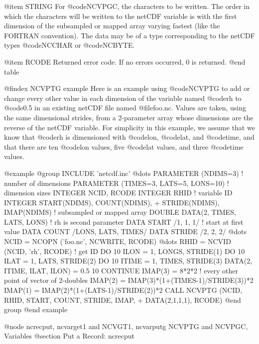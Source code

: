 @item STRING
For @code{NCVPGC}, the characters to be written.  The order in which the
characters will be written to the netCDF variable
is with the
first dimension
of the subsampled or mapped array
varying fastest (like the FORTRAN convention).
The data
may be of a type corresponding to the netCDF types @code{NCCHAR} or
@code{NCBYTE}.

@item RCODE
Returned error code.  If no errors occurred, 0 is returned.
@end table

@findex NCVPTG example
Here is an example using @code{NCVPTG} to add or change every other
value in each dimension
of the variable named @code{rh} to @code{0.5} in an existing
netCDF file named @file{foo.nc}.
Values are taken, using the same dimensional strides, from a 2-parameter
array whose dimensions
are the reverse of the netCDF variable.
For simplicity in this example, we
assume that we know that @code{rh} is dimensioned with @code{lon},
@code{lat}, and @code{time}, and that there are ten @code{lon} values, five
@code{lat} values, and three @code{time} values.

@example
@group
      INCLUDE 'netcdf.inc'
         @dots{}
      PARAMETER (NDIMS=3)         ! number of dimensions
      PARAMETER (TIMES=3, LATS=5, LONS=10) ! dimension sizes
      INTEGER  NCID, RCODE
      INTEGER  RHID               ! variable ID
      INTEGER  START(NDIMS), COUNT(NDIMS),
     +         STRIDE(NDIMS), IMAP(NDIMS)  ! subsampled or mapped array
      DOUBLE DATA(2, TIMES, LATS, LONS)    ! rh is second parameter
      DATA START /1, 1, 1/        ! start at first value
      DATA COUNT /LONS, LATS, TIMES/
      DATA STRIDE /2, 2, 2/
         @dots{}
      NCID = NCOPN ('foo.nc', NCWRITE, RCODE)
         @dots{}
      RHID = NCVID (NCID, 'rh', RCODE)   ! get ID
      DO 10 ILON = 1, LONGS, STRIDE(1)
         DO 10 ILAT = 1, LATS, STRIDE(2)
            DO 10 ITIME = 1, TIMES, STRIDE(3)
               DATA(2, ITIME, ILAT, ILON) = 0.5
   10 CONTINUE
      IMAP(3) = 8*2*2   ! every other point of vector of 2-doubles
      IMAP(2) = IMAP(3)*(1+(TIMES-1)/STRIDE(3))*2
      IMAP(1) = IMAP(2)*(1+(LATS-1)/STRIDE(2))*2
      CALL NCVPTG (NCID, RHID, START, COUNT, STRIDE, IMAP,
     +             DATA(2,1,1,1), RCODE)
@end group
@end example

@node ncrecput, ncvarget1 and NCVGT1, ncvarputg NCVPTG and NCVPGC, Variables
@section Put a Record:  ncrecput


